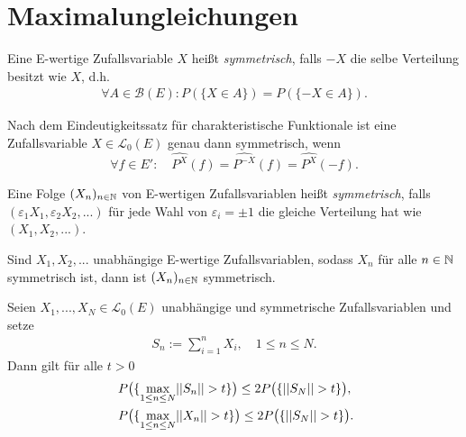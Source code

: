 \section{Maximalungleichungen}

\begin{mydef}
    Eine E-wertige Zufallsvariable $X$ heißt \textit{symmetrisch}, falls $-X$ die selbe Verteilung besitzt wie $X$, d.h.
    \begin{align*}
        \forall A \in \mathcal{B}(E): P(\{X \in A\}) = P(\{-X \in A\}). 
    \end{align*}
\end{mydef}

\begin{remark}
    Nach dem Eindeutigkeitssatz für charakteristische Funktionale ist eine Zufallsvariable $X \in \mathcal{L}_0(E)$ genau dann symmetrisch, wenn 
    $$
        \forall f \in E': \quad \widehat{P^X}(f) = \widehat{P^{-X}}(f) = \widehat{P^X}(-f). 
    $$
\end{remark}

\begin{mydef}%
    Eine Folge $(X_n)_{n \in \mathbb{N}}$ von E-wertigen Zufallsvariablen heißt \textit{symmetrisch}, 
    falls $(\varepsilon_1 X_1, \varepsilon_2 X_2,...)$ für jede Wahl von $\varepsilon_i = \pm 1$ 
    die gleiche Verteilung hat wie $(X_1,X_2,...)$. 
\end{mydef}

\begin{remark}
   Sind $X_1,X_2,...$ unabhängige E-wertige Zufallsvariablen, sodass $X_n$ für alle $n \in \mathbb{N}$ symmetrisch ist, dann ist $(X_n)_{n \in \mathbb{N}}$ symmetrisch. 
\end{remark}

\begin{theorem}
    Seien $X_1,...,X_N \in \mathcal{L}_0(E)$ unabhängige und symmetrische Zufallsvariablen und setze 
    \begin{align*}
        S_n := \sum_{i=1}^n X_i, \quad 1 \leq n \leq N. 
    \end{align*}
    Dann gilt für alle $t > 0$
    \begin{align}
        &P\big(\{ \max_{1 \leq n \leq N} \lvert\lvert S_n \rvert\rvert > t \}\big) \leq 2 P\big(\{\lvert\lvert S_N \rvert\rvert > t \}\big), \\\
        &P\big(\{ \max_{1 \leq n \leq N} \lvert\lvert X_n \rvert\rvert > t \}\big) \leq 2 P\big(\{\lvert\lvert S_N \rvert\rvert > t \}\big).
    \end{align}
\end{theorem}

